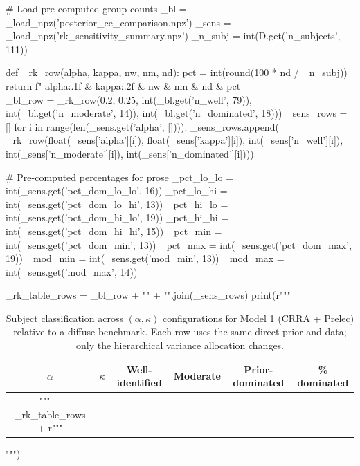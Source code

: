 \documentclass[12pt,a4paper]{article}
\theoremstyle{definition}
\theoremstyle{remark}
\begin{document}
\begin{pycode}
# Load pre-computed group counts
_bl = _load_npz('posterior_ce_comparison.npz')
_sens = _load_npz('rk_sensitivity_summary.npz')
_n_subj = int(D.get('n_subjects', 111))

def _rk_row(alpha, kappa, nw, nm, nd):
    pct = int(round(100 * nd / _n_subj))
    return f"    {alpha:.1f} & {kappa:.2f} & {nw} & {nm} & {nd} & {pct}\\%

_bl_row = _rk_row(0.2, 0.25, int(_bl.get('n_well', 79)), int(_bl.get('n_moderate', 14)), int(_bl.get('n_dominated', 18)))
_sens_rows = []
for i in range(len(_sens.get('alpha', []))):
    _sens_rows.append(
        _rk_row(float(_sens['alpha'][i]), float(_sens['kappa'][i]),
                int(_sens['n_well'][i]), int(_sens['n_moderate'][i]),
                int(_sens['n_dominated'][i])))

# Pre-computed percentages for prose
_pct_lo_lo = int(_sens.get('pct_dom_lo_lo', 16))
_pct_lo_hi = int(_sens.get('pct_dom_lo_hi', 13))
_pct_hi_lo = int(_sens.get('pct_dom_hi_lo', 19))
_pct_hi_hi = int(_sens.get('pct_dom_hi_hi', 15))
_pct_min = int(_sens.get('pct_dom_min', 13))
_pct_max = int(_sens.get('pct_dom_max', 19))
_mod_min = int(_sens.get('mod_min', 13))
_mod_max = int(_sens.get('mod_max', 14))

_rk_table_rows = _bl_row + "\n" + "\n".join(_sens_rows)
print(r"""
\begin{table}[h!]
  \centering
  \begin{tabular}{cc|cccc}
    \toprule
    $\alpha$ & $\kappa$ & Well-identified & Moderate & Prior-dominated & \% dominated \\
    \midrule
""" + _rk_table_rows + r"""
    \bottomrule
  \end{tabular}
  \caption{Subject classification across $(\alpha, \kappa)$ configurations
    for Model 1 (CRRA + Prelec) relative to a diffuse benchmark.
    Each row uses the same direct prior and data;
    only the hierarchical variance allocation changes.}
  \label{tab:rk_sensitivity}
\end{table}
""")
\end{pycode}
\end{document}
